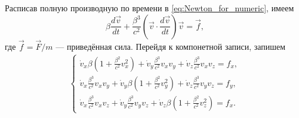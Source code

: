 Расписав полную производную по времени в \eqref{eq:Newton_for_numeric}, имеем
\begin{equation}
\beta \frac{d \vec{v}}{dt} + \frac{\beta^3}{c^2} (\vec{v} \cdot \frac{d \vec{v}}{dt}) \vec{v} = \vec{f},
\end{equation}
где $\vec{f} = \vec{F}/m$ --- приведённая сила. Перейдя к компонетной записи, запишем
\begin{eqnarray*}
\begin{cases}
\dot{v}_x \beta \left(1 + \frac{\beta^2}{c^2} v_x^2 \right) +
\dot{v}_y \frac{\beta^3}{c^2} v_x v_y + 
\dot{v}_z \frac{\beta^3}{c^2} v_x v_z  = f_x, \\

\dot{v}_x \frac{\beta^3}{c^2} v_x v_y +
\dot{v}_y \beta \left(1 + \frac{\beta^2}{c^2} v_y^2 \right) + 
\dot{v}_z \frac{\beta^3}{c^2} v_y v_z  = f_y, \\

\dot{v}_x  \frac{\beta^3}{c^2} v_x v_z +
\dot{v}_y \frac{\beta^3}{c^2} v_y v_z + 
\dot{v}_z \beta \left(1 + \frac{\beta^2}{c^2} v_z^2 \right)  = f_x.
\end{cases}
\end{eqnarray*}

